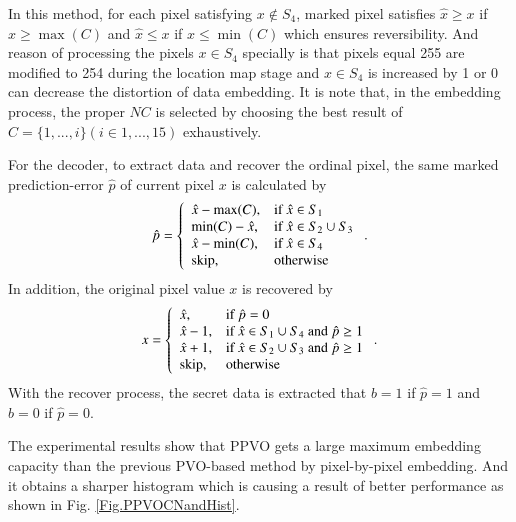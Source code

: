 \documentclass[review,3p,10pt,sort&compress]{elsarticle}
\begin{document}
In this method, for each pixel satisfying $x \notin S_4$, marked pixel satisfies $\hat{x} \geq x$ if $x \geq \max(C)$ and $\hat{x} \leq x$ if $x \leq \min(C)$ which ensures reversibility.
And reason of processing the pixels $x \in S_4$ specially is that pixels equal 255 are modified to 254 during the location map stage and $x \in S_4$ is increased by 1 or 0 can decrease the distortion of data embedding. It is note that, in the embedding process, the proper $NC$ is selected by choosing the best result of $C = \{1,...,i\}(i \in {1,...,15})$ exhaustively.

For the decoder, to extract data and recover the ordinal pixel, the same marked prediction-error $\hat{p}$ of current pixel $x$ is calculated by
\begin{equation}\label{eq:PPVOdMinNeqMax}
\hat{p} = \left\{\begin{array}{ll}
\hat{x} - \max(C),  & \text{if } \hat{x} \in S_1  \\
\min(C) - \hat{x},  & \text{if } \hat{x} \in S_2 \cup S_3 \\
\hat{x} - \min(C),  & \text{if } \hat{x} \in S_4  \\
{\rm skip},         & \text{otherwise}
\end{array}\right..
\end{equation}
In addition, the original pixel value $x$ is recovered by
\begin{equation}\label{eq:PPVOdMPixel}
x = \left\{\begin{array}{ll}
\hat{x},        & \text{if } \hat{p} = 0 \\
\hat{x} - 1,    & \text{if } \hat{x} \in S_1 \cup S_4 \text{ and } \hat{p} \geq 1 \\
\hat{x} + 1,    & \text{if } \hat{x} \in S_2 \cup S_3 \text{ and } \hat{p} \geq 1 \\
{\rm skip},         & \text{otherwise}
\end{array}\right..
\end{equation}
With the recover process, the secret data is extracted that $b = 1$ if $\hat{p}=1$ and $b = 0$ if $\hat{p} = 0$.

The experimental results show that PPVO gets a large maximum embedding capacity than the previous PVO-based method \cite{Li2013PVO,Peng2014IPVO} by pixel-by-pixel embedding. And it obtains a sharper histogram which is causing a result of better performance as shown in Fig. \ref{Fig.PPVOCNandHist}.

\end{document}
